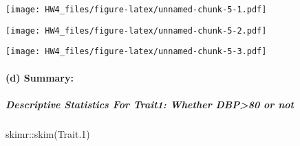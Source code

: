 \documentclass[
]{article}
\newenvironment{Shaded}{\begin{snugshade}}{\end{snugshade}}
\newcommand{\AttributeTok}[1]{\textcolor[rgb]{0.77,0.63,0.00}{#1}}
\newcommand{\DecValTok}[1]{\textcolor[rgb]{0.00,0.00,0.81}{#1}}
\newcommand{\FloatTok}[1]{\textcolor[rgb]{0.00,0.00,0.81}{#1}}
\newcommand{\FunctionTok}[1]{\textcolor[rgb]{0.00,0.00,0.00}{#1}}
\newcommand{\NormalTok}[1]{#1}
\newcommand{\SpecialCharTok}[1]{\textcolor[rgb]{0.00,0.00,0.00}{#1}}
\newcommand{\StringTok}[1]{\textcolor[rgb]{0.31,0.60,0.02}{#1}}
\begin{document}
\begin{Shaded}
\end{Shaded}

\texttt{[image: HW4\_files/figure-latex/unnamed-chunk-5-1.pdf]}

\begin{Shaded}
\end{Shaded}

\texttt{[image: HW4\_files/figure-latex/unnamed-chunk-5-2.pdf]}

\begin{Shaded}
\end{Shaded}

\texttt{[image: HW4\_files/figure-latex/unnamed-chunk-5-3.pdf]}

\hypertarget{d-summary}{%
\paragraph{(d) Summary:}\label{d-summary}}

\hypertarget{descriptive-statistics-for-trait1-whether-dbp80-or-not}{%
\subparagraph{Descriptive Statistics For Trait1: Whether
DBP\textgreater80 or
not}\label{descriptive-statistics-for-trait1-whether-dbp80-or-not}}

\begin{Shaded}
\begin{Highlighting}[]
\NormalTok{skimr}\SpecialCharTok{::}\FunctionTok{skim}\NormalTok{(Trait}\FloatTok{.1}\NormalTok{)}
\end{Highlighting}
\end{Shaded}
\end{document}
